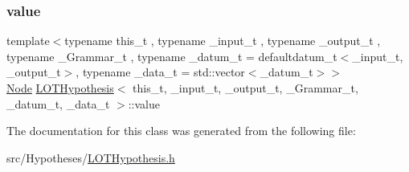 \mbox{\label{class_l_o_t_hypothesis_ac8a3c198b5210ea032901b8f7070d6e8}} 
\subsubsection{\texorpdfstring{value}{value}}
{\footnotesize\ttfamily template$<$typename this\+\_\+t , typename \+\_\+input\+\_\+t , typename \+\_\+output\+\_\+t , typename \+\_\+\+Grammar\+\_\+t , typename \+\_\+datum\+\_\+t  = defaultdatum\+\_\+t$<$\+\_\+input\+\_\+t, \+\_\+output\+\_\+t$>$, typename \+\_\+data\+\_\+t  = std\+::vector$<$\+\_\+datum\+\_\+t$>$$>$ \\
\hyperlink{class_node}{Node} \hyperlink{class_l_o_t_hypothesis}{L\+O\+T\+Hypothesis}$<$ this\+\_\+t, \+\_\+input\+\_\+t, \+\_\+output\+\_\+t, \+\_\+\+Grammar\+\_\+t, \+\_\+datum\+\_\+t, \+\_\+data\+\_\+t $>$\+::value\hspace{0.3cm}{\ttfamily [protected]}}



The documentation for this class was generated from the following file\+:\begin{DoxyCompactItemize}
\item 
src/\+Hypotheses/\hyperlink{_l_o_t_hypothesis_8h}{L\+O\+T\+Hypothesis.\+h}\end{DoxyCompactItemize}
